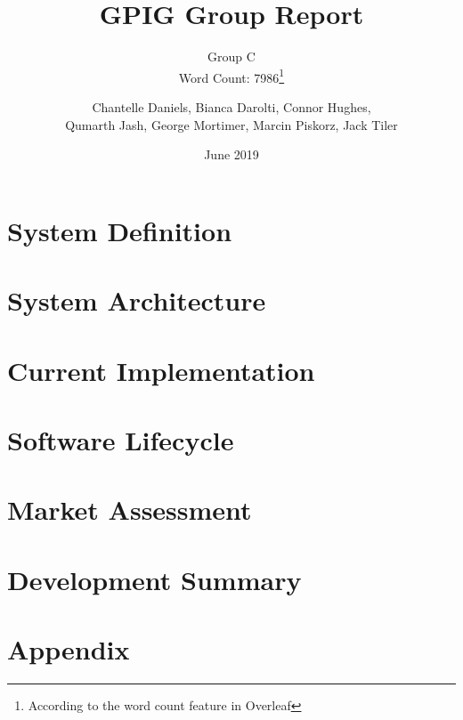 \documentclass{UoYCSproject}
\title{GPIG Group Report}
\subtitle{Group C\\ Word Count: 7986\thanks{According to the word count feature in Overleaf}}
\author{Chantelle Daniels, Bianca Darolti, Connor Hughes,\\ Qumarth Jash, George Mortimer, Marcin Piskorz, Jack Tiler}
\date{June 2019}
\begin{document}
\maketitle
{}
\chapter{System Definition} \label{systemdef}


\chapter{System Architecture} \label{systemarch}


\chapter{Current Implementation} \label{currentimp}


\chapter{Software Lifecycle} \label{softwarelife}


\chapter{Market Assessment} \label{market}


\chapter{Development Summary} \label{devsummary}


\appendix
\chapter{Appendix}



\printbibliography
\end{document}
